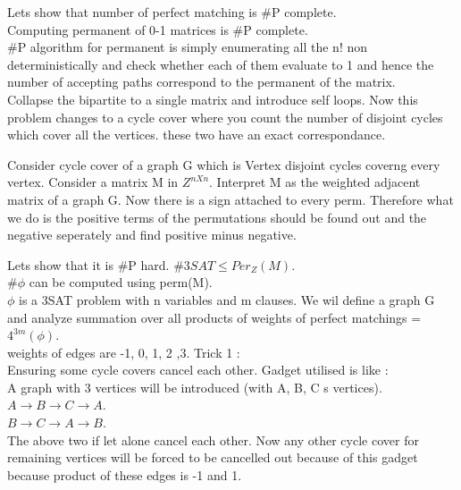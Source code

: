 \documentclass[solution,addpoints,12pt]{exam}
\begin{document}
Lets show that number of perfect matching is \#P complete.\\
Computing permanent of 0-1 matrices is \#P complete.\\
\#P algorithm for permanent is simply enumerating all the n! non deterministically
and check whether each of them evaluate to 1 and hence the number of accepting paths
correspond to the permanent of the matrix.\\

Collapse the bipartite to a single matrix and introduce self loops.
Now this problem changes to a cycle cover where you count the number of disjoint
cycles which cover all the vertices. these two have an exact correspondance.

Consider cycle cover of a graph G which is Vertex disjoint
cycles coverng every vertex. Consider a matrix M in $Z^{nXn}$. Interpret
M as the weighted adjacent matrix of a graph G.
Now there is a sign attached to every perm. Therefore what we do is
the positive terms of the permutations should be found out and the negative
seperately and find positive minus negative.

Lets show that it is \#P hard.
$\#3SAT \le Per_Z(M)$.\\
$\#\phi$ can be computed using perm(M).\\
$\phi$ is a 3SAT problem with n variables and m clauses.
We wil define a graph G and analyze summation over all products of weights
of perfect matchings = $4^{3m}(\phi)$.\\
weights of edges are {-1, 0, 1, 2 ,3}.
Trick 1 :\\
Ensuring some cycle covers cancel each other.
Gadget utilised is like :\\
A graph with 3 vertices will be introduced (with A, B, C s vertices).
$A \rightarrow B \rightarrow C \rightarrow A$.\\
$B \rightarrow C \rightarrow A \rightarrow B$.\\
The above two if let alone cancel each other.
Now any other cycle cover for remaining vertices will be forced to be
cancelled out because of this gadget because product of these edges is -1
and 1.\\
\end{document}
